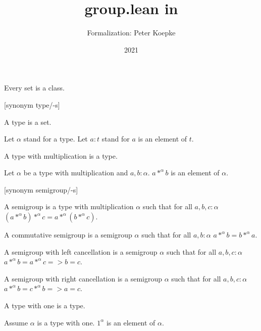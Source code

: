 \documentclass{article}
\title{group.lean in \Naproche}
\author{Formalization: Peter Koepke}
\date{2021}
\begin{document}

  \maketitle


\begin{forthel}

\begin{lemma} Every set is a class.
\end{lemma}

[synonym type/-s]
\begin{signature} A type is a set.
\end{signature}
Let $\alpha$ stand for a type.
Let $a : t$ stand for $a$ is an element of $t$.

\begin{signature} A type with multiplication is a type.
\end{signature}
\begin{signature} Let $\alpha$ be a type with multiplication and $a,b : \alpha$. 
$a *^{\alpha} b$ is an element of $\alpha$.
\end{signature}
  
[synonym semigroup/-s]
\begin{definition} A semigroup is a type with multiplication $\alpha$
such that for all $a,b,c : \alpha$
$(a *^{\alpha} b) *^{\alpha} c = a *^{\alpha} (b *^{\alpha} c)$. 
\end{definition}

\begin{definition} A commutative semigroup is a semigroup $\alpha$
such that for all $a,b : \alpha$
$a *^{\alpha} b = b *^{\alpha} a$.
\end{definition}

\begin{definition} A semigroup with left cancellation is a semigroup
$\alpha$ such that for all $a,b,c : \alpha$
$a *^{\alpha} b = a *^{\alpha} c => b = c$.
\end{definition}

\begin{definition} A semigroup with right cancellation is a semigroup
$\alpha$ such that for all $a,b,c : \alpha$
$a *^{\alpha} b = c *^{\alpha} b => a = c$.
\end{definition}

\begin{signature} A type with one is a type.
\end{signature}
\begin{signature} Assume $\alpha$ is a type with one. $1^{\alpha}$ is an
element of $\alpha$.
\end{signature}


\end{forthel}
\end{document}
